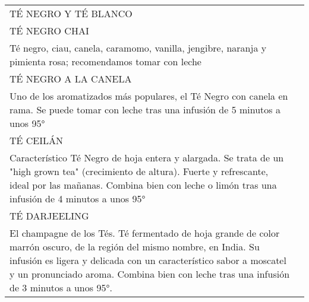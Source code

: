 \documentclass[12pt]{article}
\makeatletter
\newcommand*\ColText[1]{\textcolor{Goldenrod3}{#1}}
\newenvironment{Group}[1]
{\noindent\begin{tabular*}{\textwidth}{@{}p{1\linewidth}@{\extracolsep{\fill}}r@{}}
{\fontsize{24}{29}\selectfont\ColText{#1}}
              \\[0.8em]}
              {
\end{tabular*}}
\newcommand*\Entry[1]{%
    \sffamily#1}
\newcommand*\Expl[1]{%
    \hspace*{1em}\footnotesize #1}
\makeatother
\begin{document}
    \vfill
    \begin{Group}{TÉ NEGRO Y TÉ BLANCO}
        \Entry{TÉ NEGRO CHAI} \\
        \Expl{Té negro, ciau, canela, caramomo, vanilla, jengibre, naranja y pimienta rosa; recomendamos tomar con leche} \\
        \Entry{TÉ NEGRO A LA CANELA} \\
        \Expl{Uno de los aromatizados más populares, el Té Negro con canela en rama. Se puede tomar con leche tras una infusión de 5 minutos a unos 95°} \\
        \Entry{TÉ CEILÁN} \\
        \Expl{Característico Té Negro de hoja entera y alargada. Se trata de un "high grown tea" (crecimiento de altura). Fuerte y refrescante, ideal por las mañanas. Combina bien con leche o limón tras una infusión de 4 minutos a unos 95°} \\
        \Entry{TÉ DARJEELING} \\
        \Expl{El champagne de los Tés. Té fermentado de hoja grande de color marrón oscuro, de la región del mismo nombre, en India. Su infusión es ligera y delicada con un característico sabor a moscatel y un pronunciado aroma. Combina bien con leche tras una infusión de 3 minutos a unos 95°. } \\
    \end{Group}
\end{document}

